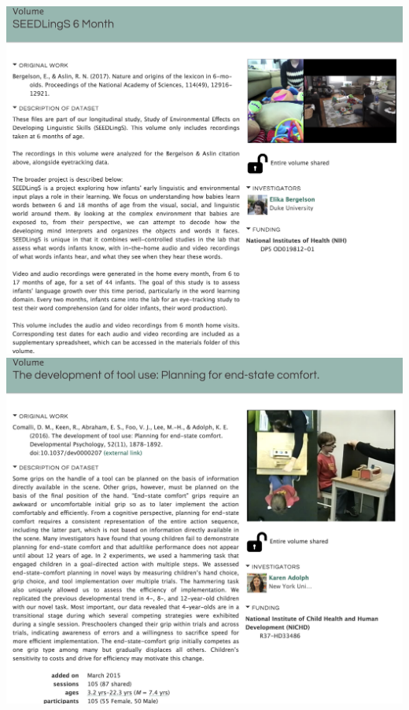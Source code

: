\documentclass[landscape,final,paperwidth=75in,paperheight=48in,fontscale=0.285]{baposter}
\begin{document}
\begin{poster}
{\begin{center}
    \hfill
    \includegraphics[scale=0.32,valign=t]{img/volume330.png}
    \hfill
    \includegraphics[scale=0.32,valign=t]{img/volume114.png}
\end{center}

}
\end{poster}
\end{document}
